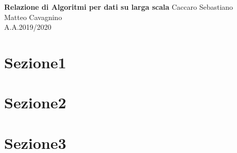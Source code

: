 \documentclass[a4paper,12pt]{article}
\begin{document}
\begin{titlepage}
\begin{center}
	\Large{\textbf{Relazione  di Algoritmi per dati su larga scala}}
\vfill
\normalsize{Caccaro Sebastiano}\\
\normalsize{Matteo Cavagnino}\\
\normalsize{A.A.2019/2020}
\end{center}
\end{titlepage}
\tableofcontents

\clearpage

\section{Sezione1}
\section{Sezione2}
\section{Sezione3}
\end{document}
